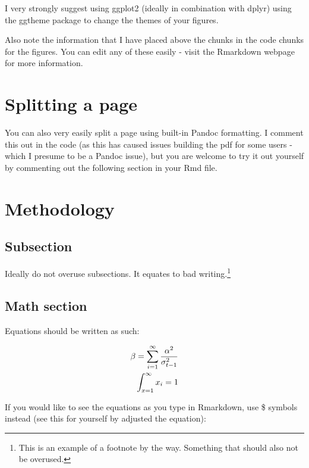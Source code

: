 \documentclass[12pt,preprint, authoryear]{elsarticle}
\numberwithin{equation}{section}
\numberwithin{figure}{section}
\numberwithin{table}{section}
\let\rmarkdownfootnote\footnote%
\def\footnote{\protect\rmarkdownfootnote}
\begin{document}
I very strongly suggest using ggplot2 (ideally in combination with
dplyr) using the ggtheme package to change the themes of your figures.

Also note the information that I have placed above the chunks in the
code chunks for the figures. You can edit any of these easily - visit
the Rmarkdown webpage for more information.

\hypertarget{splitting-a-page}{%
\section{Splitting a page}\label{splitting-a-page}}

You can also very easily split a page using built-in Pandoc formatting.
I comment this out in the code (as this has caused issues building the
pdf for some users - which I presume to be a Pandoc issue), but you are
welcome to try it out yourself by commenting out the following section
in your Rmd file.

\hypertarget{methodology}{%
\section{\texorpdfstring{Methodology
\label{Meth}}{Methodology }}\label{methodology}}

\hypertarget{subsection}{%
\subsection{Subsection}\label{subsection}}

Ideally do not overuse subsections. It equates to bad
writing.\footnote{This is an example of a footnote by the way. Something
  that should also not be overused.}

\hypertarget{math-section}{%
\subsection{Math section}\label{math-section}}

Equations should be written as such:

\begin{align}
\beta = \sum_{i = 1}^{\infty}\frac{\alpha^2}{\sigma_{t-1}^2} \label{eq1} \\
\int_{x = 1}^{\infty}x_{i} = 1 \notag
\end{align}

If you would like to see the equations as you type in Rmarkdown, use \$
symbols instead (see this for yourself by adjusted the equation):
\end{document}
